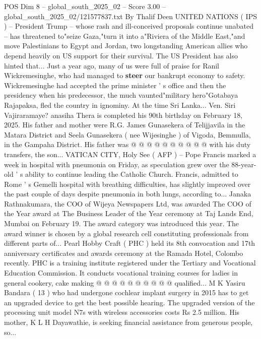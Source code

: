 \begin{textsample}{POS Dim 8 – global\_south\_2025\_02 – Score 3.00 – global\_south\_2025\_02/121577837.txt}  \label{ex:f8_pos_392}
By Thalif Deen UNITED NATIONS ( IPS ) -- President Trump -- whose rash and ill-conceived proposals continue unabated -- has threatened to"seize Gaza,"turn it into a"Riviera of the Middle East,"and move Palestinians to Egypt and Jordan, two longstanding American allies who depend heavily on US support for their survival.
The US President has also hinted that...
Just a year ago, many of us were full of praise for Ranil Wickremesinghe, who had managed to \textbf{steer} our bankrupt economy to safety.
Wickremesinghe had accepted the prime minister ' s office and then the presidency when his predecessor, the much vaunted"military hero"Gotabaya Rajapaksa, fled the country in ignominy.
At the time Sri Lanka...
Ven.
Siri Vajiraramaye? anasiha Thera is completed his 90th birthday on February 18, 2025.
His father and mother were R.G.
James Gunasekera of Telijjavila in the Matara District and Seela Gunasekera ( nee Wijesinghe ) of Vigoda, Bemmulla, in the Gampaha District.
His father was @ @ @ @ @ @ @ @ @ @ with his duty transfers, the son...
VATICAN CITY, Holy See ( AFP ) -- Pope Francis marked a week in hospital with pneumonia on Friday, as speculation grew over the 88-year-old ' s ability to continue leading the Catholic Church.
Francis, admitted to Rome ' s Gemelli hospital with breathing difficulties, has slightly improved over the past couple of days despite pneumonia in both lungs, according to...
Janaka Rathnakumara, the COO of Wijeya Newspapers Ltd, was awarded The COO of the Year award at The Business Leader of the Year ceremony at Taj Lands End, Mumbai on February 19.
The award category was introduced this year.
The award winner is chosen by a global research cell constituting professionals from different parts of...
Pearl Hobby Craft ( PHC ) held its 8th convocation and 17th anniversary certificates and awards ceremony at the Ramada Hotel, Colombo recently.
PHC is a training institute registered under the Tertiary and Vocational Education Commission.
It conducts vocational training courses for ladies in general cookery, cake making @ @ @ @ @ @ @ @ @ @ qualified...
M K Yasiru Bandara ( 13 ) who had undergone cochlear implant surgery in 2015 has to get an upgraded device to get the best possible hearing.
The upgraded version of the processing unit model N7s with wireless accessories costs Rs 2.5 million.
His mother, K L H Dayawathie, is seeking financial assistance from generous people, so...

\end{textsample}
